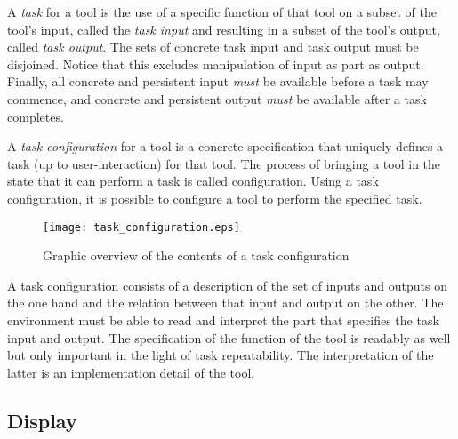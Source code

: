 \documentclass{article}
\begin{document}
   A \textit{task} for a tool is the use of a specific function of that tool on
   a subset of the tool's input, called the \textit{task input} and resulting
   in a subset of the tool's output, called \textit{task output}.  The sets of
   concrete task input and task output must be disjoined.  Notice that this
   excludes manipulation of input as part as output.  Finally, all concrete and
   persistent input \emph{must} be available before a task may commence, and
   concrete and persistent output \emph{must} be available after a task
   completes.

   A \textit{task configuration} for a tool is a concrete specification that
   uniquely defines a task (up to user-interaction) for that tool. The process
   of bringing a tool in the state that it can perform a task is called
   configuration. Using a task configuration, it is possible to configure a
   tool to perform the specified task.

   \begin{figure}[H]
    \begin{center}
     \texttt{[image: task\_configuration.eps]}
    \end{center}
    \caption{Graphic overview of the contents of a task configuration}
   \end{figure}

   \noindent A task configuration consists of a description of the set of
   inputs and outputs on the one hand and the relation between that input and
   output on the other. The environment must be able to read and interpret the
   part that specifies the task input and output. The specification of the
   function of the tool is readably as well but only important in the light of
   task repeatability. The interpretation of the latter is an implementation
   detail of the tool.
   


  \subsection{Display}
\end{document}
